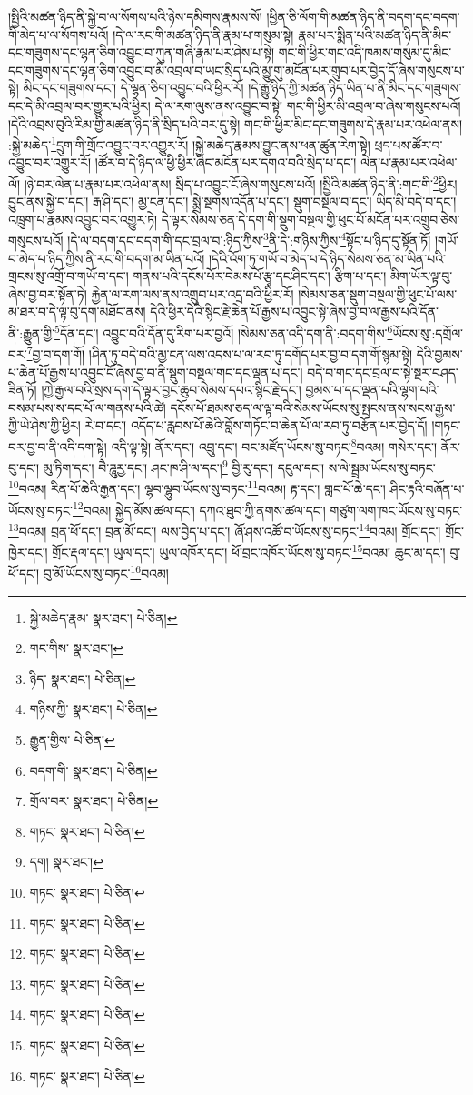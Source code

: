 །སྤྱིའི་མཚན་ཉིད་ནི་སྐྱེ་བ་ལ་སོགས་པའི་ཉེས་དམིགས་རྣམས་སོ། །ཕྱིན་ཅི་ལོག་གི་མཚན་ཉིད་ནི་བདག་དང་བདག་གི་མེད་པ་ལ་སོགས་པའོ། །དེ་ལ་རང་གི་མཚན་ཉིད་ནི་རྣམ་པ་གསུམ་སྟེ། རྣམ་པར་སྨིན་པའི་མཚན་ཉིད་ནི་མིང་དང་གཟུགས་དང་ལྷན་ཅིག་འབྱུང་བ་ཀུན་གཞི་རྣམ་པར་ཤེས་པ་སྟེ། གང་གི་ཕྱིར་གང་འདི་ཁམས་གསུམ་དུ་མིང་དང་གཟུགས་དང་ལྷན་ཅིག་འབྱུང་བ་མི་འབྲལ་བ་ཡང་སྲིད་པའི་མྱུ་གུ་མངོན་པར་གྲུབ་པར་བྱེད་དོ་ཞེས་གསུངས་པ་སྟེ། མིང་དང་གཟུགས་དང་། དེ་ལྷན་ཅིག་འབྱུང་བའི་ཕྱིར་རོ། །དེ་རྒྱུ་ཉིད་ཀྱི་མཚན་ཉིད་ཡིན་པ་ནི་མིང་དང་གཟུགས་དང་དེ་མི་འབྲལ་བར་གྱུར་པའི་ཕྱིར། དེ་ལ་རག་ལུས་ནས་འབྱུང་བ་སྟེ། གང་གི་ཕྱིར་མི་འབྲལ་བ་ཞེས་གསུངས་པའོ། །དེའི་འབྲས་བུའི་རིམ་གྱི་མཚན་ཉིད་ནི་སྲིད་པའི་བར་དུ་སྟེ། གང་གི་ཕྱིར་མིང་དང་གཟུགས་དེ་རྣམ་པར་འཕེལ་ནས། :སྐྱེ་མཆེད་\footnote{སྐྱེ་མཆེད་རྣམ་  སྣར་ཐང་།  པེ་ཅིན། }དྲུག་གི་གྲོང་འབྱུང་བར་འགྱུར་རོ། །སྐྱེ་མཆེད་རྣམས་བྱུང་ནས་ཕན་ཚུན་རེག་སྟེ། ཕྲད་པས་ཚོར་བ་འབྱུང་བར་འགྱུར་རོ། །ཚོར་བ་དེ་ཉིད་ལ་ཕྱི་ཕྱིར་ཞིང་མངོན་པར་དགའ་བའི་སྲེད་པ་དང་། ལེན་པ་རྣམ་པར་འཕེལ་ལོ། །ཉེ་བར་ལེན་པ་རྣམ་པར་འཕེལ་ནས། སྲིད་པ་འབྱུང་ངོ་ཞེས་གསུངས་པའོ། །སྤྱིའི་མཚན་ཉིད་ནི་:གང་གི་\footnote{གང་གིས་  སྣར་ཐང་། }ཕྱིར། བྱུང་ནས་སྐྱེ་བ་དང་། རྒ་ཤི་དང་། མྱ་ངན་དང་། སྨྲེ་སྔགས་འདོན་པ་དང་། སྡུག་བསྔལ་བ་དང་། ཡིད་མི་བདེ་བ་དང་། འཁྲུག་པ་རྣམས་འབྱུང་བར་འགྱུར་ཏེ། དེ་ལྟར་སེམས་ཅན་དེ་དག་གི་སྡུག་བསྔལ་གྱི་ཕུང་པོ་མངོན་པར་འགྲུབ་ཅེས་གསུངས་པའོ། །དེ་ལ་བདག་དང་བདག་གི་དང་བྲལ་བ་:ཉིད་ཀྱིས་\footnote{ཉིད་  སྣར་ཐང་།  པེ་ཅིན། }ནི་དེ་:གཉིས་ཀྱིས་\footnote{གཉིས་ཀྱི་  སྣར་ཐང་།  པེ་ཅིན། }སྟོང་པ་ཉིད་དུ་སྟོན་ཏོ། །གཡོ་བ་མེད་པ་ཉིད་ཀྱིས་ནི་རང་གི་བདག་མ་ཡིན་པའོ། །དེའི་འོག་ཏུ་གཡོ་བ་མེད་པ་དེ་ཉིད་སེམས་ཅན་མ་ཡིན་པའི་གྲངས་སུ་འགྲོ་བ་གཡོ་བ་དང་། གནས་པའི་དངོས་པོར་བེམས་པོ་རྩྭ་དང་ཤིང་དང་། རྩིག་པ་དང་། མིག་ཡོར་ལྟ་བུ་ཞེས་བྱ་བར་སྟོན་ཏེ། རྐྱེན་ལ་རག་ལས་ནས་འགྲུབ་པར་འདྲ་བའི་ཕྱིར་རོ། །སེམས་ཅན་སྡུག་བསྔལ་གྱི་ཕུང་པོ་ལས་མ་ཐར་བ་དེ་ལྟ་བུ་དག་མཐོང་ནས། དེའི་ཕྱིར་དེའི་སྙིང་རྗེ་ཆེན་པོ་རྒྱས་པ་འབྱུང་སྟེ་ཞེས་བྱ་བ་ལ་རྒྱས་པའི་དོན་ནི་:རྒྱུན་གྱི་\footnote{རྒྱུན་གྱིས་  པེ་ཅིན། }དོན་དང་། འབྱུང་བའི་དོན་དུ་རིག་པར་བྱའོ། །སེམས་ཅན་འདི་དག་ནི་:བདག་གིས་\footnote{བདག་གི་  སྣར་ཐང་།  པེ་ཅིན། }ཡོངས་སུ་:དགྲོལ་བར་\footnote{གྲོལ་བར་  སྣར་ཐང་།  པེ་ཅིན། }བྱ་བ་དག་གོ། །ཤིན་ཏུ་བདེ་བའི་མྱ་ངན་ལས་འདས་པ་ལ་རབ་ཏུ་དགོད་པར་བྱ་བ་དག་གོ་སྙམ་སྟེ། དེའི་བྱམས་པ་ཆེན་པོ་རྒྱས་པ་འབྱུང་ངོ་ཞེས་བྱ་བ་ནི་སྡུག་བསྔལ་གང་དང་ལྡན་པ་དང་། བདེ་བ་གང་དང་བྲལ་བ་སྟེ་སྔར་བཤད་ཟིན་ཏོ། །ཀྱེ་རྒྱལ་བའི་སྲས་དག་དེ་ལྟར་བྱང་ཆུབ་སེམས་དཔའ་སྙིང་རྗེ་དང་། བྱམས་པ་དང་ལྡན་པའི་ལྷག་པའི་བསམ་པས་ས་དང་པོ་ལ་གནས་པའི་ཚེ། དངོས་པོ་ཐམས་ཅད་ལ་ལྟ་བའི་སེམས་ཡོངས་སུ་སྤངས་ནས་སངས་རྒྱས་ཀྱི་ཡེ་ཤེས་ཀྱི་ཕྱིར། རེ་བ་དང་། འདོད་པ་རླབས་པོ་ཆེའི་བློས་གཏོང་བ་ཆེན་པོ་ལ་རབ་ཏུ་བརྩོན་པར་བྱེད་དོ། །གཏང་བར་བྱ་བ་ནི་འདི་དག་སྟེ། འདི་ལྟ་སྟེ། ནོར་དང་། འབྲུ་དང་། བང་མཛོད་ཡོངས་སུ་བཏང་\footnote{གཏང་  སྣར་ཐང་།  པེ་ཅིན། }བའམ། གསེར་དང་། ནོར་བུ་དང་། མུ་ཏིག་དང་། བཻ་ཌཱུརྱ་དང་། ཤང་ཁ་ཤི་ལ་དང་།\footnote{དག།  སྣར་ཐང་། } བྱི་རུ་དང་། དངུལ་དང་། ས་ལེ་སྦྲམ་ཡོངས་སུ་བཏང་\footnote{གཏང་  སྣར་ཐང་།  པེ་ཅིན། }བའམ། རིན་པོ་ཆེའི་རྒྱན་དང་། ལྷབ་ལྷུབ་ཡོངས་སུ་བཏང་\footnote{གཏང་  སྣར་ཐང་།  པེ་ཅིན། }བའམ། རྟ་དང་། གླང་པོ་ཆེ་དང་། ཤིང་རྟའི་བཞོན་པ་ཡོངས་སུ་བཏང་\footnote{གཏང་  སྣར་ཐང་།  པེ་ཅིན། }བའམ། སྐྱེད་མོས་ཚལ་དང་། དཀའ་ཐུབ་ཀྱི་ནགས་ཚལ་དང་། གཙུག་ལག་ཁང་ཡོངས་སུ་བཏང་\footnote{གཏང་  སྣར་ཐང་།  པེ་ཅིན། }བའམ། བྲན་ཕོ་དང་། བྲན་མོ་དང་། ལས་བྱེད་པ་དང་། ཞོ་ཤས་འཚོ་བ་ཡོངས་སུ་བཏང་\footnote{གཏང་  སྣར་ཐང་།  པེ་ཅིན། }བའམ། གྲོང་དང་། གྲོང་ཁྱེར་དང་། གྲོང་རྡལ་དང་། ཡུལ་དང་། ཡུལ་འཁོར་དང་། ཕོ་བྲང་འཁོར་ཡོངས་སུ་བཏང་\footnote{གཏང་  སྣར་ཐང་།  པེ་ཅིན། }བའམ། ཆུང་མ་དང་། བུ་ཕོ་དང་། བུ་མོ་ཡོངས་སུ་བཏང་\footnote{གཏང་  སྣར་ཐང་།  པེ་ཅིན། }བའམ། 